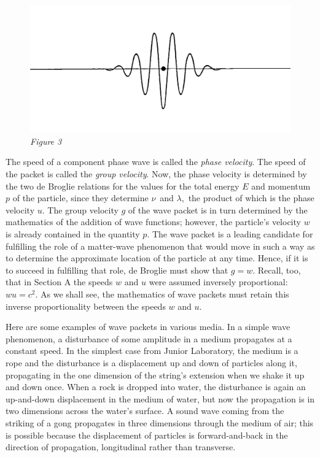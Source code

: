 \begin{figure}[h] %
  \begin{center}
    \includegraphics[width=.7\textwidth,height=.34436\textwidth]{images/08_debroglie/pilot.jpg}
  \caption*{\emph{Figure 3}}
  \end{center}
\end{figure}

The speed of a component phase wave is called the \emph{phase velocity}.
The speed of the packet is called the \emph{group velocity}. Now, the
phase velocity is determined by the two de Broglie relations for the
values for the total energy $E$ and momentum $p$ of the
particle, since they determine $\nu$~and $\lambda$,~the product of
which is the phase velocity $u$. The group velocity $g$ of the
wave packet is in turn determined by the mathematics of the addition of
wave functions; however, the particle's velocity $w$ is already
contained in the quantity $p$. The wave packet is a leading
candidate for fulfilling the role of a matter-wave phenomenon that would
move in such a way as to determine the approximate location of the
particle at any time. Hence, if it is to succeed in fulfilling that
role, de Broglie must show that $g = w$. Recall, too, that
in Section A the speeds $w$ and $u$ were assumed inversely
proportional: $wu = c^2$. As we shall see, the mathematics of
wave packets must retain this inverse proportionality between the speeds
$w$ and $u$.

Here are some examples of wave packets in various media. In a simple
wave phenomenon, a disturbance of some amplitude in a medium propagates
at a constant speed. In the simplest case from Junior Laboratory, the
medium is a rope and the disturbance is a displacement up and down of
particles along it, propagating in the one dimension of the string's
extension when we shake it up and down once. When a rock is dropped into
water, the disturbance is again an up-and-down displacement in the
medium of water, but now the propagation is in two dimensions across the
water's surface. A sound wave coming from the striking of a gong
propagates in three dimensions through the medium of air; this is
possible because the displacement of particles is forward-and-back in
the direction of propagation, longitudinal rather than transverse.

